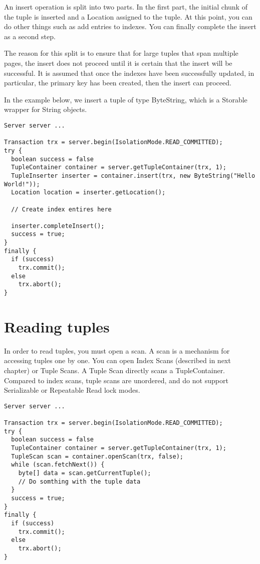 \documentclass[a4paper,draft,oneside]{book}
\begin{document}
An insert operation is split into two parts. In the first part,
the initial chunk of the tuple is inserted and a Location assigned to
the tuple. At this point, you can do other things such as add entries 
to indexes. You can finally complete the insert as a second step.

The reason for this split is to ensure that for large tuples that
span multiple pages, the insert does not proceed until it is certain
that the insert will be successful. It is assumed that once the
indexes have been successfully updated, in particular, the primary 
key has been created, then the insert can proceed.

In the example below, we insert a tuple of type ByteString, which is
a Storable wrapper for String objects.

\begin{verbatim}
Server server ...

Transaction trx = server.begin(IsolationMode.READ_COMMITTED);
try {
  boolean success = false      
  TupleContainer container = server.getTupleContainer(trx, 1);
  TupleInserter inserter = container.insert(trx, new ByteString("Hello World!"));
  Location location = inserter.getLocation();
 
  // Create index entires here

  inserter.completeInsert();
  success = true;
}
finally {
  if (success)
    trx.commit();
  else
    trx.abort();
}
\end{verbatim}

\section{Reading tuples}

In order to read tuples, you must open a scan. A scan is a mechanism
for accessing tuples one by one. You can open Index Scans (described in
next chapter) or Tuple Scans. A Tuple Scan directly scans a TupleContainer.
Compared to index scans, tuple scans are unordered, and do not support
Serializable or Repeatable Read lock modes.

\begin{verbatim}
Server server ...

Transaction trx = server.begin(IsolationMode.READ_COMMITTED);
try {
  boolean success = false      
  TupleContainer container = server.getTupleContainer(trx, 1);
  TupleScan scan = container.openScan(trx, false);
  while (scan.fetchNext()) {
    byte[] data = scan.getCurrentTuple();
    // Do somthing with the tuple data
  }
  success = true;
}
finally {
  if (success)
    trx.commit();
  else
    trx.abort();
}
\end{verbatim}
\end{document}
